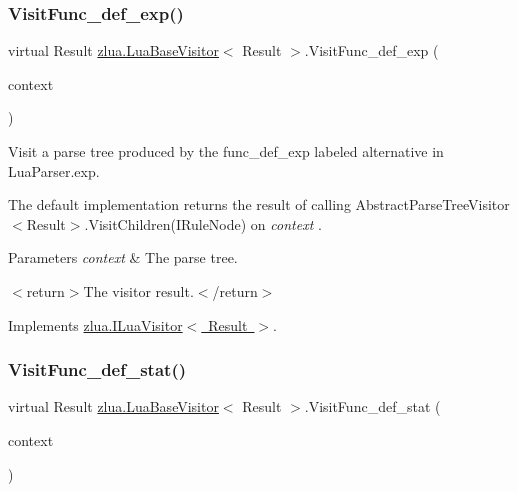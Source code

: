 \subsubsection{\texorpdfstring{Visit\+Func\+\_\+def\+\_\+exp()}{VisitFunc\_def\_exp()}}
{\footnotesize\ttfamily virtual Result \mbox{\hyperlink{classzlua_1_1_lua_base_visitor}{zlua.\+Lua\+Base\+Visitor}}$<$ Result $>$.Visit\+Func\+\_\+def\+\_\+exp (\begin{DoxyParamCaption}\item[{\mbox{[}\+Not\+Null\mbox{]} \mbox{\hyperlink{classzlua_1_1_lua_parser_1_1_func__def__exp_context}{Lua\+Parser.\+Func\+\_\+def\+\_\+exp\+Context}}}]{context }\end{DoxyParamCaption})\hspace{0.3cm}{\ttfamily [virtual]}}



Visit a parse tree produced by the {\ttfamily func\+\_\+def\+\_\+exp} labeled alternative in Lua\+Parser.\+exp. 

The default implementation returns the result of calling Abstract\+Parse\+Tree\+Visitor$<$\+Result$>$.\+Visit\+Children(\+I\+Rule\+Node) on {\itshape context} . 


\begin{DoxyParams}{Parameters}
{\em context} & The parse tree.\\
\hline
\end{DoxyParams}
$<$return$>$The visitor result.$<$/return$>$ 

Implements \mbox{\hyperlink{interfacezlua_1_1_i_lua_visitor_a2907308bdf63ed2a3311e89b411f0bb5}{zlua.\+I\+Lua\+Visitor$<$ Result $>$}}.

\mbox{\label{classzlua_1_1_lua_base_visitor_ac9505bda82c85093117ee5931e73f59c}} 
\subsubsection{\texorpdfstring{Visit\+Func\+\_\+def\+\_\+stat()}{VisitFunc\_def\_stat()}}
{\footnotesize\ttfamily virtual Result \mbox{\hyperlink{classzlua_1_1_lua_base_visitor}{zlua.\+Lua\+Base\+Visitor}}$<$ Result $>$.Visit\+Func\+\_\+def\+\_\+stat (\begin{DoxyParamCaption}\item[{\mbox{[}\+Not\+Null\mbox{]} \mbox{\hyperlink{classzlua_1_1_lua_parser_1_1_func__def__stat_context}{Lua\+Parser.\+Func\+\_\+def\+\_\+stat\+Context}}}]{context }\end{DoxyParamCaption})\hspace{0.3cm}{\ttfamily [virtual]}}



